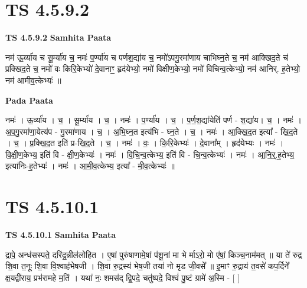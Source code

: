 \documentclass[17pt]{extarticle}
\begin{document}
\section*{ TS 4.5.9.2 }

\textbf{TS 4.5.9.2 } \newline
\textbf{Samhita Paata} \newline

नम॑ ऊ॒र्व्या॑य च सू॒र्म्या॑य च॒ नमः॑ प॒र्ण्या॑य च पर्णश॒द्या॑य च॒ नमो॑ऽपगु॒रमा॑णाय चाभिघ्न॒ते च॒ नम॑ आक्खिद॒ते च॑ प्रक्खिद॒ते च॒ नमो॑ वः किरि॒केभ्यो॑ दे॒वानाꣳ॒॒ हृद॑येभ्यो॒ नमो॑ विक्षीण॒केभ्यो॒ नमो॑ विचिन्व॒त्केभ्यो॒ नम॑ आनिर्. ह॒तेभ्यो॒ नम॑ आमीव॒त्केभ्यः॑ ॥ \newline

\textbf{Pada Paata} \newline

नमः॑ । ऊ॒र्व्या॑य । च॒ । सू॒र्म्या॑य । च॒ । नमः॑ । प॒र्ण्या॑य । च॒ । प॒र्ण॒श॒द्या॑येति॑ पर्ण - श॒द्या॑य। च॒ । नमः॑ । अ॒प॒गु॒रमा॑णा॒येत्य॑प - गु॒रमा॑णाय । च॒ । अ॒भि॒घ्न॒त इत्य॑भि - घ्न॒ते । च॒ । नमः॑ । आ॒क्खि॒द॒त इत्या᳚ - खि॒द॒ते । च॒ । प्र॒क्खि॒द॒त इति॑ प्र-खि॒द॒ते । च॒ । नमः॑ । वः॒ । कि॒रि॒केभ्यः॑ । दे॒वाना᳚म् । हृद॑येभ्यः । नमः॑ । वि॒क्षी॒ण॒केभ्य॒ इति॑ वि - क्षी॒ण॒केभ्यः॑ । नमः॑ । वि॒चि॒न्व॒त्केभ्य॒ इति॑ वि - चि॒न्व॒त्केभ्यः॑ । नमः॑ । आ॒नि॒र्॒.ह॒तेभ्य॒ इत्या॑निः-ह॒तेभ्यः॑ । नमः॑ । आ॒मी॒व॒त्केभ्य॒ इत्या᳚ - मी॒व॒त्केभ्यः॑ ॥  \newline




\section*{ TS 4.5.10.1 }

\textbf{TS 4.5.10.1 } \newline
\textbf{Samhita Paata} \newline

द्रापे॒ अन्ध॑सस्पते॒ दरि॑द्र॒न्नील॑लोहित । ए॒षां पुरु॑षाणामे॒षां प॑शू॒नां मा भे र्माऽरो॒ मो ए॑षां॒ किञ्च॒नाम॑मत् ॥ या ते॑ रुद्र शि॒वा त॒नूः शि॒वा वि॒श्वाह॑भेषजी । शि॒वा रु॒द्रस्य॑ भेष॒जी तया॑ नो मृड जी॒वसे᳚ ॥                                    इ॒माꣳ रु॒द्राय॑ त॒वसे॑ कप॒र्दिने᳚ क्ष॒यद्वी॑राय॒ प्रभ॑रामहे म॒तिं । यथा॑ नः॒ शमस॑द् द्वि॒पदे॒ चतु॑ष्पदे॒ विश्वं॑ पु॒ष्टं ग्रामे॑ अ॒स्मि - [  ] \newline
\end{document}
